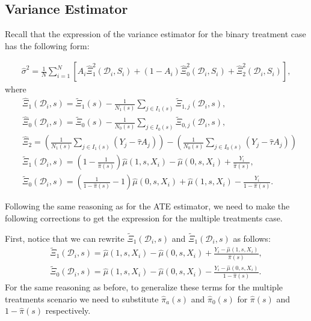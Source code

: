 \documentclass{article}
\begin{document}
\subsection*{Variance Estimator}

Recall that the expression of the variance estimator for the binary treatment case has the following form:

\begin{align}
	\hat{\sigma}^2 = \frac{1}{N} \sum_{i=1}^N \left[A_i\hat{\Xi}_{1}^2(\mathcal D_i, S_i) + (1- A_i) \hat{\Xi}_{0}^2(\mathcal D_i, S_i) + \hat{\Xi}_2^2(\mathcal D_i, S_i) \right], \nonumber
\end{align}
where 
\begin{align}
	&\hat{\Xi}_{1}(\mathcal D_i, s) = \tilde{\Xi}_{1}(s) - \frac{1}{N_1(s)} \sum_{j \in I_1(s)} \tilde{\Xi}_{1,j}(\mathcal D_i, s) \nonumber, \\
	&\hat{\Xi}_{0}(\mathcal D_i, s) = \tilde{\Xi}_{0}(s) - \frac{1}{N_0(s)} \sum_{j \in I_0(s)} \tilde{\Xi}_{0,j}(\mathcal D_i, s) \nonumber , \\
	& \hat{\Xi}_2 = \left(\frac{1}{N_1(s)} \sum_{j \in I_1(s)} (Y_j - \hat{\tau} A_j) \right) - \left(\frac{1}{N_0(s)} \sum_{j \in I_0(s)} (Y_j - \hat{\tau} A_j)\right) \nonumber \\
	&\tilde{\Xi}_{1}(\mathcal D_i, s) = \left(1 - \frac{1}{\hat{\pi}(s)} \right) \hat{\mu}(1,s,X_i) - \hat{\mu}(0,s,X_i) + \frac{Y_i}{\hat{\pi}(s)}, \nonumber \\
	& \tilde{\Xi}_{0}(\mathcal D_i, s) = \left(\frac{1}{1 - \hat{\pi}(s)} - 1 \right) \hat{\mu}(0,s,X_i) + \hat{\mu}(1,s,X_i) - \frac{Y_i}{1-\hat{\pi}(s)}. \nonumber
\end{align}

Following the same reasoning as for the ATE estimator, we need to make the following corrections to get the expression for the multiple treatments case.

First, notice that we can rewrite $\tilde{\Xi}_{1}(\mathcal D_i, s)$ and $\tilde{\Xi}_{1}(\mathcal D_i, s)$ as follows:
\begin{align}
\tilde{\Xi}_1(\mathcal D_i,s) = \hat{\mu}(1,s,X_i) - \hat{\mu}(0,s,X_i) + \frac{Y_i - \hat{\mu}(1,s,X_i)}{\hat{\pi}(s)}, \nonumber \\
\tilde{\Xi}_0(\mathcal D_i,s) = \hat{\mu}(1,s,X_i) - \hat{\mu}(0,s,X_i) - \frac{Y_i - \hat{\mu}(0,s,X_i)}{1 - \hat{\pi}(s)} \nonumber.
\end{align}
For the same reasoning as before, to generalize these terms for the multiple treatments scenario we need to substitute $\hat{\pi}_a(s)$ and $\hat{\pi}_0(s)$ for $\hat{\pi}(s)$ and $1 - \hat{\pi}(s)$ respectively.
\end{document}
